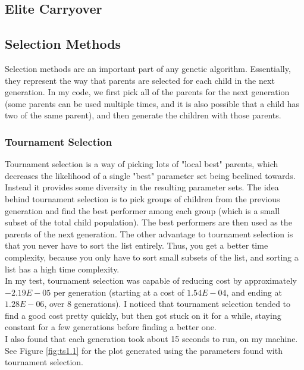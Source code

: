 \documentclass[]{article}
\begin{document}
\subsection{Elite Carryover}

\subsection{Selection Methods}
Selection methods are an important part of any genetic algorithm. Essentially, they represent the way that parents are selected for each child in the next generation. In my code, we first pick all of the parents for the next generation (some parents can be used multiple times, and it is also possible that a child has two of the same parent), and then generate the children with those parents.
\subsubsection{Tournament Selection}
Tournament selection is a way of picking lots of "local best" parents, which decreases the likelihood of a single "best" parameter set being beelined towards. Instead it provides some diversity in the resulting parameter sets. The idea behind tournament selection is to pick groups of children from the previous generation and find the best performer among each group (which is a small subset of the total child population). The best performers are then used as the parents of the next generation. The other advantage to tournament selection is that you never have to sort the list entirely. Thus, you get a better time complexity, because you only have to sort small subsets of the list, and sorting a list has a high time complexity. \\

In my test, tournament selection was capable of reducing cost by approximately $-2.19E-05$ per generation (starting at a cost of $1.54E-04$, and ending at $1.28E-06$, over $8$ generations). I noticed that tournament selection tended to find a good cost pretty quickly, but then got stuck on it for a while, staying constant for a few generations before finding a better one. \\

I also found that each generation took about 15 seconds to run, on my machine. \\

See Figure \ref{fig:ts1.1} for the plot generated using the parameters found with tournament selection.
\end{document}
